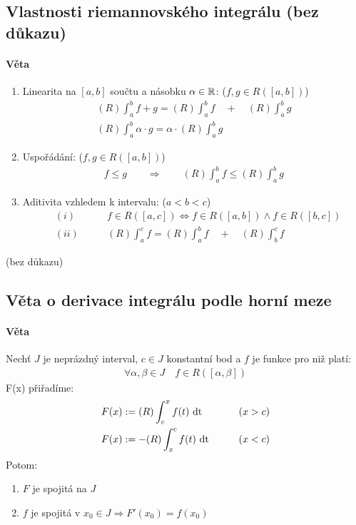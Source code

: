 \documentclass[a4paper,10pt]{article}
\begin{document}
\subsection{Vlastnosti riemannovského integrálu (bez důkazu)}
\setcounter{equation}{0}
\paragraph{Věta}
\begin{enumerate}
	\item Linearita na $[a,b]$ součtu a násobku $\alpha \in \mathbb{R}$: ($f,g \in R([a,b])$)
		\begin{align*}
			(R) \int_a^b f+g = (R) \int_a^b f \quad + \quad (R) \int_a^b g\\
			(R) \int_a^b \alpha \cdot g = \alpha \cdot (R) \int_a^b g
		\end{align*}
	\item Uspořádání: ($f,g \in R([a,b])$)
		\begin{align*}
			f \le g \qquad \Rightarrow \qquad (R) \int_a^b f \le (R) \int_a^b g
		\end{align*}
	\item Aditivita vzhledem k intervalu: ($a<b<c$)
		\begin{align*}
			&(i) \qquad &f \in R([a,c]) \Leftrightarrow f \in R([a,b]) \land f
			\in R([b,c])\\
			&(ii) \qquad &(R) \int_a^c f = (R) \int_a^b f \quad + \quad (R) \int_b^c f
		\end{align*}
\end{enumerate}
(bez důkazu)

\subsection{Věta o derivace integrálu podle horní meze}
\setcounter{equation}{0}
\paragraph{Věta}
Nechť $J$ je neprázdný interval, $c \in J$ konstantní bod a $f$ je funkce pro niž platí:
\begin{align*}
	\forall \alpha, \beta \in J \quad f \in R([\alpha, \beta])
\end{align*}
F(x) přiřadíme:
\begin{align*}
	F(x) &:=  (R) \int_c^x f(t) \operatorname*{\,dt} \qquad &(x > c) \\
	F(x) &:= -  (R) \int_x^c f(t) \operatorname*{\,dt} \qquad &(x < c)
\end{align*}
Potom:
\begin{enumerate}
	\item $F$ je spojitá na $J$
	\item $f$ je spojitá v $x_0 \in J \Rightarrow F'(x_0) = f(x_0)$
\end{enumerate}
\end{document}
